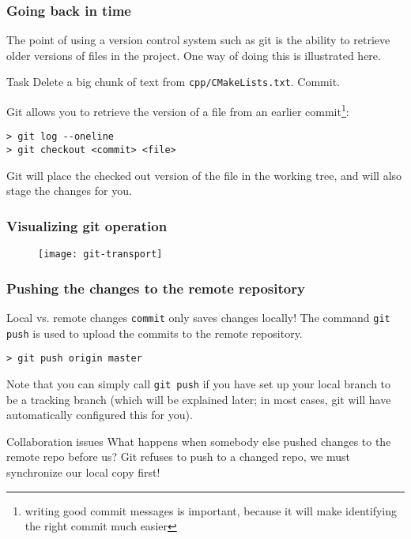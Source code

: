 \begin{frame}[fragile]

\frametitle{Going back in time}

The point of using a version control system such as git is the ability to retrieve older versions of files in the project. One way of doing this is illustrated here.

	\begin{block}{Task}
	Delete a big chunk of text from \texttt{cpp/CMakeLists.txt}. Commit.
	\end{block}
	
	Git allows you to retrieve the version of a file from an earlier commit\footnote{writing good commit messages is important, because it will make identifying \\the right commit much easier}:
	\begin{verbatim}
> git log --oneline
> git checkout <commit> <file>
	\end{verbatim}
	Git will place the checked out version of the file in the working tree, and will also stage the changes for you.
\end{frame}


\begin{frame}[fragile]
	\frametitle{Visualizing git operation}
	
	\begin{figure}
		\texttt{[image: git-transport]}
	\end{figure}
\end{frame}


\begin{frame}[fragile]
	\frametitle{Pushing the changes to the remote repository}
	
	\begin{block}{Local vs. remote changes}
	\texttt{commit} only saves changes \alert{locally}! The command \texttt{git push} is used to upload the commits to the remote repository. 
	
	\begin{verbatim}
> git push origin master
	\end{verbatim}
	\end{block}

Note that you can simply call \texttt{git push} if you have set up your local branch to be a tracking branch (which will be explained later; in most cases, git will have automatically configured this for you).

	\begin{block}{Collaboration issues}
What happens when somebody else pushed changes to the remote repo before us? Git refuses to push to a changed repo, we must synchronize our local copy first!
	\end{block}	
	
\end{frame}

